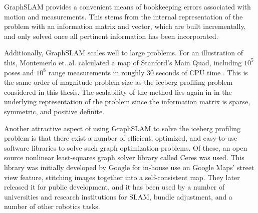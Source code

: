 GraphSLAM provides a convenient means of bookkeeping errors associated with motion and measurements. This stems from the internal representation of the problem with an information matrix and vector, which are built incrementally, and only solved once all pertinent information has been incorporated. 


Additionally, GraphSLAM scales well to large problems. For an illustration of this, Montemerlo et. al. calculated a map of Stanford's Main Quad, including $10^5$ poses and $10^8$ range measurements in roughly 30 seconds of CPU time \cite{Thrun2005}. This is the same order of magnitude problem size as the iceberg profiling problem considered in this thesis. The scalability of the method lies again in in the underlying representation of the problem since the information matrix is sparse, symmetric, and positive definite.

Another attractive aspect of using GraphSLAM to solve the iceberg profiling problem is that there exist a number of efficient, optimized, and easy-to-use software libraries to solve such graph optimization problems. Of these, an open source nonlinear least-squares graph solver library called Ceres was used. This library was initially developed by Google for in-house use on Google Maps' street view feature, stitching images together into a self-consistent map. They later released it for public development, and it has been used by a number of universities and research institutions for SLAM, bundle adjustment, and a number of other robotics tasks. \cite{Agarwal2012}

%
%
%

